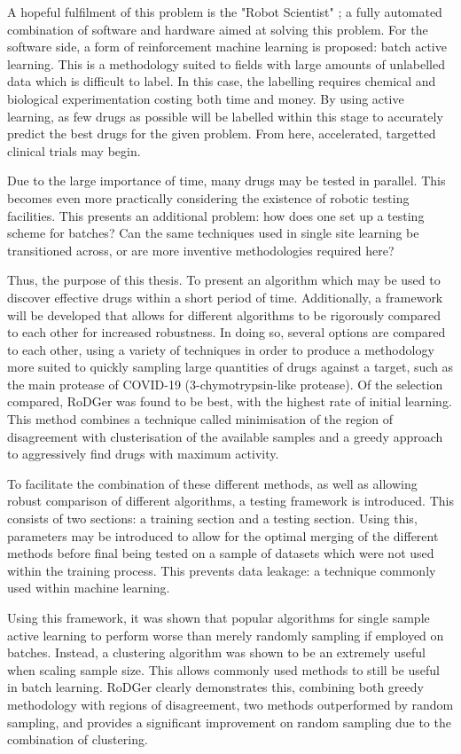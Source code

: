 A hopeful fulfilment of this problem is the "Robot Scientist" \cite{And10}; a fully automated combination of software and hardware aimed at solving this problem. For the software side, a form of reinforcement machine learning is proposed: batch active learning. This is a methodology suited to fields with large amounts of unlabelled data which is difficult to label. In this case, the labelling requires chemical and biological experimentation costing both time and money. By using active learning, as few drugs as possible will be labelled within this stage to accurately predict the best drugs for the given problem. From here, accelerated, targetted clinical trials may begin.

Due to the large importance of time, many drugs may be tested in parallel. This becomes even more practically considering the existence of robotic testing facilities. This presents an additional problem: how does one set up a testing scheme for batches? Can the same techniques used in single site learning be transitioned across, or are more inventive methodologies required here?

Thus, the purpose of this thesis. To present an algorithm which may be used to discover effective drugs within a short period of time. Additionally, a framework will be developed that allows for different algorithms to be rigorously compared to each other for increased robustness. In doing so, several options are compared to each other, using a variety of techniques in order to produce a methodology more suited to quickly sampling large quantities of drugs against a target, such as the main protease of \mbox{COVID-19} (3-chymotrypsin-like protease). Of the selection compared, RoDGer was found to be best, with the highest rate of initial learning. This method combines a technique called minimisation of the region of disagreement with clusterisation of the available samples and a greedy approach to aggressively find drugs with maximum activity.

To facilitate the combination of these different methods, as well as allowing robust comparison of different algorithms, a testing framework is introduced. This consists of two sections: a training section and a testing section. Using this, parameters may be introduced to allow for the optimal merging of the different methods before final being tested on a sample of datasets which were not used within the training process. This prevents data leakage: a technique commonly used within machine learning.

Using this framework, it was shown that popular algorithms for single sample active learning to perform worse than merely randomly sampling if employed on batches. Instead, a clustering algorithm was shown to be an extremely useful when scaling sample size. This allows commonly used methods to still be useful in batch learning. RoDGer clearly demonstrates this, combining both greedy methodology with regions of disagreement, two methods outperformed by random sampling, and provides a significant improvement on random sampling due to the combination of clustering.